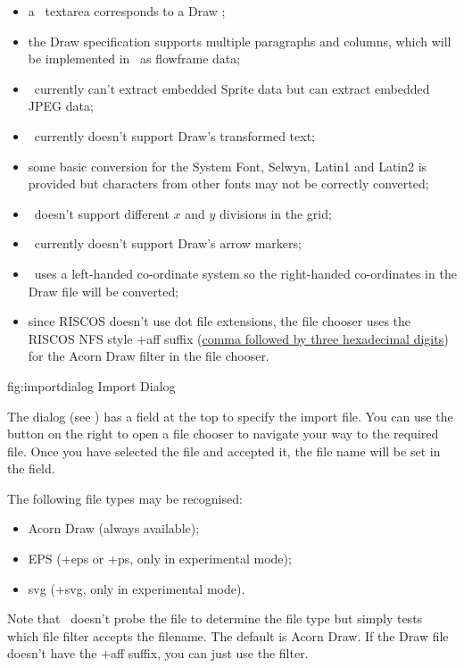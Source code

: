 \begin{itemize}
\item a \FlowframTk\ \gls{textarea} corresponds to a Draw ;
\item the Draw  specification supports multiple paragraphs
and columns, which will be implemented in \FlowframTk\ as
\gls{flowframe} data;
\item \FlowframTk\ currently can't extract embedded Sprite data
but can extract embedded JPEG data;
\item \FlowframTk\ currently doesn't support Draw's transformed text;
\item some basic conversion for the System Font, Selwyn, Latin1 and
Latin2 is provided but characters from other fonts may not be
correctly converted;
\item \FlowframTk\ doesn't support different $x$ and $y$ divisions
in the \gls{grid};
\item \FlowframTk\ currently doesn't support Draw's arrow markers;
\item \FlowframTk\ uses a left-handed \gls{co-ordinate} system so the 
right-handed \glspl{co-ordinate} in the Draw file will be converted;
\item since \gls{RISCOS} doesn't use dot file extensions, the file
chooser uses the \gls{RISCOS} \gls{NFS} style \ext+{aff} suffix 
(\href{http://www.riscos.com/support/users/omniclient/6_filemap.html}{comma 
followed by three hexadecimal digits}) for the Acorn Draw filter in the file chooser.
\end{itemize}


\FloatFig
  {fig:importdialog}
  {}
  {Import Dialog}

The  dialog (see ) has a
field at the top to specify the import file. You can use the
 button on the right to open a file chooser to
navigate your way to the required file. Once you have selected the
file and accepted it, the file name will be set in the
 field.

The following file types may be recognised:
\begin{itemize}
\item Acorn Draw (always available);
\item EPS (\ext+{eps} or \ext+{ps}, only in experimental mode);
\item \gls{svg} (\ext+{svg}, only in experimental mode).
\end{itemize}
Note that \FlowframTk\ doesn't probe the file to determine the file
type but simply tests which file filter accepts the filename. 
The default is Acorn Draw. If the Draw file doesn't have the
\ext+{aff} suffix, you can just use the  filter.

